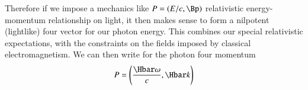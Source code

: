Therefore if we impose a mechanics like \(P = (E/c, \Bp) \) relativistic energy-momentum relationship on light, it then makes sense to form a nilpotent (lightlike) four vector for our photon energy.  This combines our special relativistic expectations, with the constraints on the fields imposed by classical electromagnetism.  We can then write for the photon four momentum
%
\begin{equation}\label{eqn:relativisticElectrodynamicsT1:136}
P = \left( \frac{\Hbar \omega}{c}, \Hbar k \right)
\end{equation}

